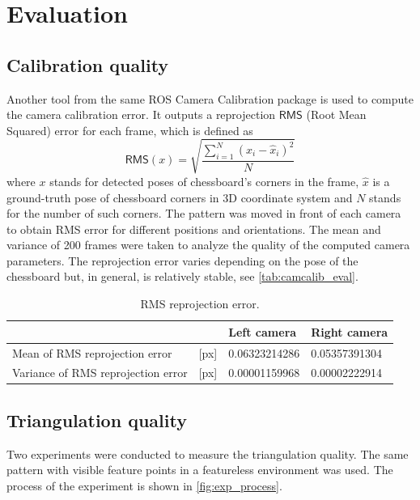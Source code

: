 \chapter{Evaluation}
\label{chapter:evaluation}

\section{Calibration quality}
Another tool from the same ROS Camera Calibration package is used to compute the camera calibration error.
It outputs a reprojection $\mathsf{RMS}$ (Root Mean Squared) error for each frame, which is defined as
\begin{equation}
    \mathsf{RMS}(x) = \sqrt{\frac{\sum_{i=1}^{N}{(x_i - \hat{x}_i)^2}}{N}}
\end{equation}
where $x$ stands for detected poses of chessboard's corners in the frame, $\hat{x}$ is a ground-truth pose of chessboard corners in 3D coordinate system and $N$ stands for the number of such corners.
The pattern was moved in front of each camera to obtain RMS error for different positions and orientations.
The mean and variance of 200 frames were taken to analyze the quality of the computed camera parameters. 
The reprojection error varies depending on the pose of the chessboard but, in general, is relatively stable, see \autoref{tab:camcalib_eval}.

\begin{table}[ht]
    \begin{center}
      \begin{tabular}{ ll l l }
      \hline
      && Left camera & Right camera \\ \hline
      Mean of RMS reprojection error & [px] & 0.06323214286 & 0.05357391304 \\
      Variance of RMS reprojection error & [px] & 0.00001159968 & 0.00002222914 \\
      \end{tabular}
    \end{center}
    \caption{RMS reprojection error.}
    \label{tab:camcalib_eval}
\end{table}

\section{Triangulation quality}
Two experiments were conducted to measure the triangulation quality.
The same pattern with visible feature points in a featureless environment was used.
The process of the experiment is shown in \autoref{fig:exp_process}.

